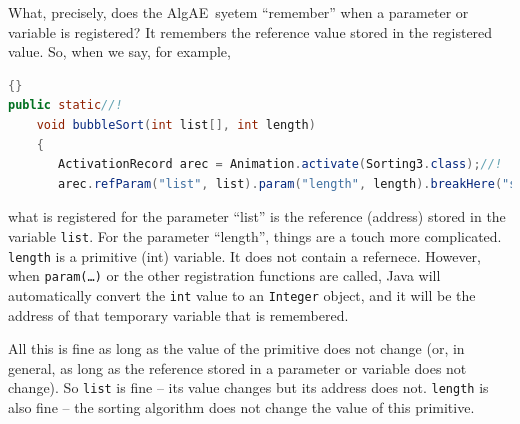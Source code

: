 \documentclass[11pt,titlepage]{book}
\newcommand{\algae}{{\sc AlgAE}}
\begin{document}
What, precisely, does the \algae\ syetem ``remember'' when a parameter or variable is registered?  It remembers the reference value stored in the registered value. So, when we say, for example,
\begin{lstlisting}[language=Java,frame=tb]{}
public static//!
    void bubbleSort(int list[], int length)
    {
       ActivationRecord arec = Animation.activate(Sorting3.class);//!
       arec.refParam("list", list).param("length", length).breakHere("starting bubble sort");//!
\end{lstlisting}
what is registered for the parameter ``list'' is the reference
(address) stored in the variable \texttt{list}. For the parameter
``length'', things are a touch more complicated. \texttt{length} is a primitive (int) variable. It does not contain a refernece. However, when \texttt{param(\ldots)} or the other registration functions are called, Java will automatically convert the \texttt{int} value to an \texttt{Integer} object, and it will be the address of that temporary variable that is remembered.

All this is fine as long as the value of the primitive does not change (or, in general, as long as the reference stored in a parameter or variable does not change).  So \texttt{list} is fine -- its value changes but its address does not. \texttt{length} is also fine -- the sorting algorithm does not change the value of this primitive.
\end{document}
